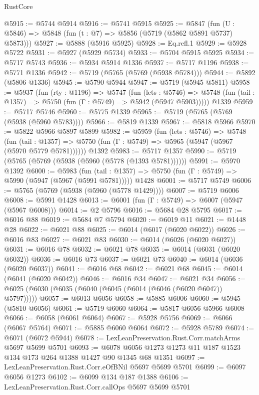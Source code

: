 \begin{lexlean}{RustCore}
\begin{coremodule}
{\begin{coremodule}
{{{{{{{{{{{{{{{{{{{{{{{{{{{{{{{{{{{{{{{{{{{{@5915 := @5744 @5914
@5916 := @5741 @5915
@5925 := @5847 (fun (U : @5846) => @5848 (fun (t : @7) => @5856 (@5719 (@5862 @5891 @5737) @5873)))
@5927 := @5888 (@5916 @5925)
@5928 := Eq.refl.{1}
@5929 := @5928 @5722
@5931 := @5927 (@5929 @5734)
@5933 := @5704 @5915 @5925
@5934 := @5717 @5743
@5936 := @5934 @5914 @1336
@5937 := @5717 @1196
@5938 := @5771 @1336
@5942 := @5719 (@5765 (@5769 (@5938 @5784)))
@5944 := @5892 (@5806 @1336)
@5945 := @5790 @5944
@5947 := @5719 (@5945 @5811)
@5958 := @5937
    (fun (rty : @1196) =>
    @5747
      (fun (lets : @5746) =>
      @5748 (fun (tail : @1357) => @5750 (fun (Γ : @5749) => @5942 (@5947 @5903)))))
    @1339
@5959 := @5717 @5746
@5960 := @5775 @1339
@5965 := @5719 (@5765 (@5769 (@5938 (@5960 @5783))))
@5966 := @5819 @1339
@5967 := @5818 @5966
@5970 := @5822 @5966 @5897 @5899
@5982 := @5959
    (fun (lets : @5746) =>
    @5748
      (fun (tail : @1357) => @5750 (fun (Γ : @5749) => @5965 (@5947 (@5967 (@5970 @5779 @5781))))))
    @1392
@5983 := @5717 @1357
@5990 := @5719 (@5765 (@5769 (@5938 (@5960 (@5778 (@1393 @5781))))))
@5991 := @5970 @1392
@6000 := @5983
    (fun (tail : @1357) => @5750 (fun (Γ : @5749) => @5990 (@5947 (@5967 (@5991 @5781)))))
    @1428
@6001 := @5717 @5749
@6006 := @5765 (@5769 (@5938 (@5960 (@5778 @1429))))
@6007 := @5719 @6006
@6008 := @5991 @1428
@6013 := @6001 (fun (Γ : @5749) => @6007 (@5947 (@5967 @6008)))
@6014 := @2 @5796
@6016 := @5684 @28 @5795
@6017 := @6016 @88
@6019 := @5684 @7 @5794
@6020 := @6019 @11
@6021 := @1448 @28
@6022 := @6021 @88
@6025 := @6014 (@6017 (@6020 @6022))
@6026 := @6016 @83
@6027 := @6021 @83
@6030 := @6014 (@6026 (@6020 @6027))
@6031 := @6016 @78
@6032 := @6021 @78
@6035 := @6014 (@6031 (@6020 @6032))
@6036 := @6016 @73
@6037 := @6021 @73
@6040 := @6014 (@6036 (@6020 @6037))
@6041 := @6016 @68
@6042 := @6021 @68
@6045 := @6014 (@6041 (@6020 @6042))
@6046 := @6016 @34
@6047 := @6021 @34
@6056 := @6025 (@6030 (@6035 (@6040 (@6045 (@6014 (@6046 (@6020 @6047)) @5797)))))
@6057 := @6013 @6056
@6058 := @5885 @6006
@6060 := @5945 (@5810 @6056)
@6061 := @5719 @6060
@6064 := @5817 @6056 @5966 @6008
@6066 := @6058 (@6061 @6064)
@6067 := @5928 @5756
@6069 := @6066 (@6067 @5764)
@6071 := @5885 @6060 @6064
@6072 := @5928 @5789
@6074 := @6071 (@6072 @5944)
@6078 := LexLeanPreservation.Rust.Corr.matchArms @5697 @5699 @5701
@6093 := @6078 @6056 @1273 @1273 @11 @187 @1523 @134 @173 @264 @1388 @1427 @90 @1345 @68 @1351
@6097 := LexLeanPreservation.Rust.Corr.eOfBNil @5697 @5699 @5701
@6099 := @6097 @6056 @1273
@6102 := @6099 @134 @187 @1388
@6106 := LexLeanPreservation.Rust.Corr.callOps @5697 @5699 @5701
}}}}}}}}}}}}}}}}}}}}}}}}}}}}}}}}}}}}}}}}}}}}
\end{coremodule}}
\end{coremodule}
\end{lexlean}
